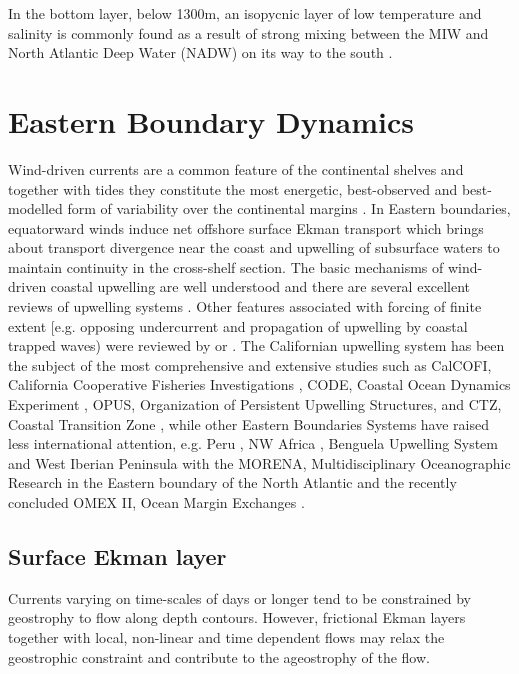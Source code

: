 In the bottom layer, below 1300m, an isopycnic layer of low
temperature and salinity is commonly found as a result of strong
mixing between the MIW and North Atlantic Deep Water (NADW) on its
way to the south \citep{Ambar94}.

\section{Eastern Boundary Dynamics}\label{sec:upw_theory} Wind-driven
currents are a common feature of the continental shelves and
together with tides they constitute the most energetic,
best-observed and best-modelled form of variability over the
continental margins \citep{Brink98}. In Eastern boundaries,
equatorward winds induce net offshore surface Ekman transport
which brings about transport divergence near the coast and
upwelling of subsurface waters to maintain continuity in the
cross-shelf section. The basic mechanisms of wind-driven coastal
upwelling are well understood and there are several excellent
reviews of upwelling systems \citep[e.g.][]{Allen80,Brink98}.
Other features associated with forcing of finite extent [e.g.
opposing undercurrent and propagation of upwelling by coastal
trapped waves) were reviewed by \citet{Huthnance81} or
\citet{Brink91}. The Californian upwelling system has been the
subject of the most comprehensive and extensive studies such as
CalCOFI, California Cooperative Fisheries Investigations
\citep{Lynn87}, CODE, Coastal Ocean Dynamics Experiment
\citep[e.g.][]{Kosro86}, OPUS, Organization of Persistent
Upwelling Structures, \citep[e.g.][]{Atkinson86} and CTZ, Coastal
Transition Zone \citep{Strub91}, while other Eastern Boundaries
Systems have raised less international attention, e.g. Peru
\citep{Smith81}, NW Africa \citep{Mittelstaed83}, Benguela
Upwelling System \citep{Andrews80} and  West Iberian Peninsula
with the MORENA, Multidisciplinary Oceanographic Research in the
Eastern boundary of the North Atlantic \citep{Fiuza96} and the
recently concluded OMEX II, Ocean Margin Exchanges
\citep{Huthnance02}.

\subsection{Surface Ekman layer}

Currents varying on time-scales of days or longer tend to be
constrained by geostrophy to flow along depth contours. However,
frictional Ekman layers together with local, non-linear and time
dependent flows may relax the geostrophic constraint and
contribute to the ageostrophy of the flow.

